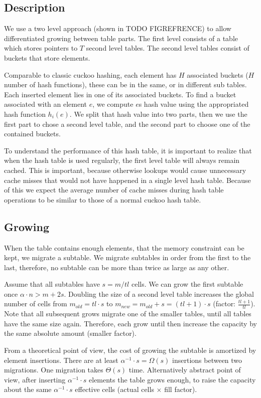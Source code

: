 \documentclass[a4paper,UKenglish]{lipics-v2016}
\begin{document}
\subsection{Description}
We use a two level approach (shown in TODO FIGREFRENCE) to allow
differentiated growing between table parts.  The first level consists
of a table which stores pointers to $T$ second level tables. The
second level tables consist of buckets that store elements.

Comparable to classic cuckoo hashing, each element has $H$ associated
buckets ($H$ number of hash functions), these can be in the same, or
in different sub tables.  Each inserted element lies in one of its
associated buckets.  To find a bucket associated with an
element $e$, we compute \(e\)s hash value using the appropriated hash function
$h_i(e)$. We split that hash value into two parts, then we use the
first part to chose a second level table, and the second part to
choose one of the contained buckets.

To understand the performance of this hash table, it is important to
realize that when the hash table is used regularly, the first level
table will always remain cached. This is important, because otherwise lookups
would cause unnecessary cache misses that would not have happened in a
single level hash table.  Because of this we expect the average number
of cache misses during hash table operations to be similar to those of
a normal cuckoo hash table.

\subsection{Growing}
When the table contains enough elements, that the memory constraint
can be kept, we migrate a subtable.  We migrate subtables in order
from the first to the last, therefore, no subtable can be more than
twice as large as any other.

Assume that all subtables have $s=m/tl$ cells. We can grow the first
subtable once $\alpha\cdot n > m+2s$.  Doubling the size of a second
level table increases the global number of cells from $m_{old} =
tl\cdot s$ to $m_{new} = m_{old}+s = (tl+1)\cdot s$ (factor:
$\frac{tl+1}{tl}$).  Note that all subsequent grows migrate one of the
smaller tables, until all tables have the same size again.  Therefore,
each grow until then increase the capacity by the same absolute amount
(smaller factor).

From a theoretical point of view, the cost of growing the subtable is
amortized by element insertions.  There are at least $\alpha^{-1}
\cdot s = \Omega(s)$ insertions between two migrations.  One migration
takes $\Theta(s)$ time. Alternatively abstract point of view, after
inserting $\alpha^{-1} \cdot s$ elements the table grows enough, to
raise the capacity about the same $\alpha^{-1} \cdot s$ effective
cells (actual cells $\times$ fill factor).
\end{document}
